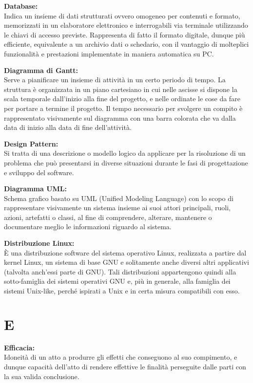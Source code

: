 \documentclass[a4paper, oneside, openany, dvipsnames, table]{article}
\begin{document}
\textbf{Database:}\\	 Indica un insieme di dati strutturati ovvero omogeneo per contenuti e formato, memorizzati in un elaboratore elettronico e interrogabili via terminale utilizzando le chiavi di accesso previste. Rappresenta di fatto il formato digitale, dunque più efficiente, equivalente a un archivio dati o schedario, con il vantaggio di molteplici funzionalità e prestazioni implementate in maniera automatica su PC.

\textbf{Diagramma di Gantt:}\\	Serve a pianificare un insieme di attività in un certo periodo di tempo. La struttura è organizzata in un piano cartesiano in cui nelle ascisse si dispone la scala temporale dall’inizio alla fine del progetto, e nelle ordinate le cose da fare per portare a termine il progetto. Il tempo necessario per svolgere un compito è rappresentato visivamente sul diagramma con una barra colorata che va dalla data di inizio alla data di fine dell’attività.

\textbf{Design Pattern:} \\	Si tratta di una descrizione o modello logico da applicare per la risoluzione di un problema che può presentarsi in diverse situazioni durante le fasi di progettazione e sviluppo del software.

\textbf{Diagramma UML:}\\	Schema grafico basato su UML (Unified Modeling Language) con lo scopo di rappresentare visivamente un sistema insieme ai suoi attori principali, ruoli, azioni, artefatti o classi, al fine di comprendere, alterare, mantenere o documentare meglio le informazioni riguardo al sistema.

\textbf{Distribuzione Linux:}\\	\`E una distribuzione software del sistema operativo Linux, realizzata a partire dal kernel Linux, un sistema di base GNU e solitamente anche diversi altri applicativi (talvolta anch'essi parte di GNU). Tali distribuzioni appartengono quindi alla sotto-famiglia dei sistemi operativi GNU e, più in generale, alla famiglia dei sistemi Unix-like, perché ispirati a Unix e in certa misura compatibili con esso.


\newpage
\section{E}
\textbf{Efficacia:}\\	Idoneità di un atto a produrre gli effetti che conseguono al suo compimento, e dunque capacità dell'atto di rendere effettive le finalità perseguite dalle parti con la sua valida conclusione. 
\end{document}
